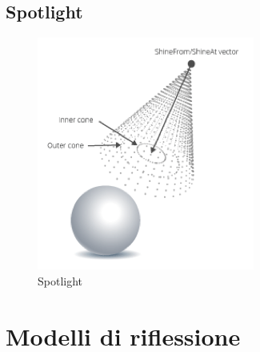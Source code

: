 \documentclass[9pt,a4paper,twoside]{tau}
\begin{document}
\subsection{Spotlight}
\begin{figure}[H]
        \centering
        \includegraphics[width=0.3\columnwidth]{Figures/04.png}
        \caption{Spotlight}
        \label{fig:figure}
\end{figure}

\section{Modelli di riflessione}
    
\end{document}
